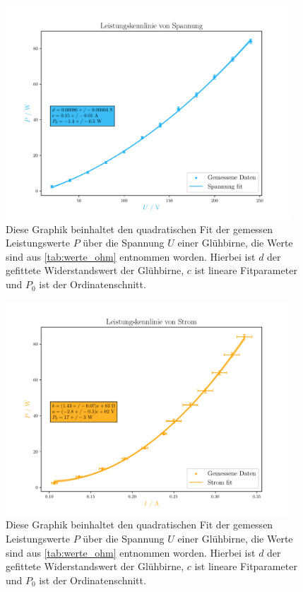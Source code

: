 \documentclass[12pt,english,ngerman]{scrartcl}
\begin{document}
\begin{figure}[H]
	\begin{center}
		\includegraphics[width = 0.95\textwidth]{figures/pUkennlinie.pdf}
	\end{center}
	\caption[Spannungsabhängige Leistungskurve einer Glühbirne]{ Diese Graphik beinhaltet
		den quadratischen Fit der gemessen Leistungswerte $P$ über die Spannung $U$
		einer Glühbirne, die Werte sind aus \autoref{tab:werte_ohm} entnommen worden.
		Hierbei ist $d$ der gefittete Widerstandswert der Glühbirne, $c$ ist lineare
		Fitparameter und $P_0$ ist der Ordinatenschnitt.
	}\label{fig:pUkennlinie}
\end{figure}

\begin{figure}[H]
	\begin{center}
		\includegraphics[width = 0.95\textwidth]{figures/pIkennlinie.pdf}
	\end{center}
	\caption[Stromabhängige Leistungskurve einer Glühbirne]{Diese Graphik beinhaltet den
		quadratischen Fit der gemessen Leistungswerte $P$ über die Spannung $U$ einer
		Glühbirne, die Werte sind aus \autoref{tab:werte_ohm} entnommen worden. Hierbei
		ist $d$ der gefittete Widerstandswert der Glühbirne, $c$ ist lineare
		Fitparameter und $P_0$ ist der Ordinatenschnitt.
	}\label{fig:pIkennlinie}
\end{figure}
\end{document}

